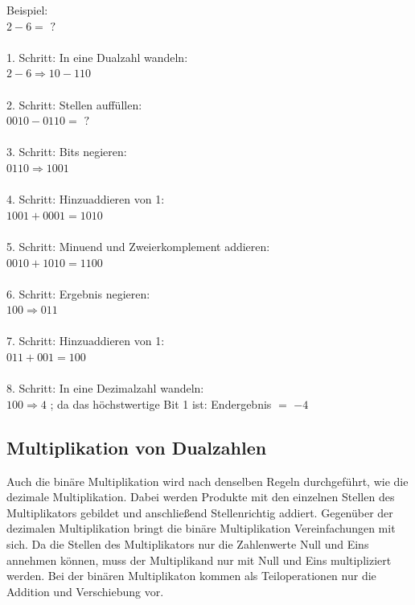 \documentclass[a4paper,12pt,fleqn,oneside]{article}
\begin{document}
\newpage

		\noindent
		Beispiel:\\
		$ 2 - 6 =$ $ ? $ \\
		\\
		1. Schritt: In eine Dualzahl wandeln:\\
		$ 2 - 6 \Rightarrow 10 - 110$\\
		\\
		2. Schritt: Stellen auffüllen:\\
		$ 0010 - 0110 =$ $ ? $\\
		\\
		3. Schritt: Bits negieren:\\
		$ 0110 \Rightarrow 1001$\\
		\\
		4. Schritt: Hinzuaddieren von 1:\\
		$ 1001 + 0001 = 1010$\\
		\\
		5. Schritt: Minuend und Zweierkomplement addieren:\\
		$ 0010 + 1010 = 1100$\\
		\\
		6. Schritt: Ergebnis negieren:\\
		$ 100 \Rightarrow 011$\\
		\\
		7. Schritt: Hinzuaddieren von 1:\\
		$ 011 + 001 = 100$\\
		\\
		8. Schritt: In eine Dezimalzahl wandeln:\\
		$ 100 \Rightarrow 4$ ; da das höchstwertige Bit 1 ist: Endergebnis $=$ $ -4$\\

\newpage

	\subsection{Multiplikation von Dualzahlen}
		Auch die binäre Multiplikation wird nach denselben Regeln durchgeführt, wie die dezimale Multiplikation. Dabei werden
		Produkte mit den einzelnen Stellen des Multiplikators gebildet und anschließend Stellenrichtig addiert. Gegenüber der
		dezimalen Multiplikation bringt die binäre Multiplikation Vereinfachungen mit sich. Da die Stellen des Multiplikators nur die
		Zahlenwerte Null und Eins annehmen können, muss der Multiplikand nur mit Null und Eins multipliziert werden. Bei der
		binären Multiplikaton kommen als Teiloperationen nur die Addition und Verschiebung vor.\\
\end{document}
